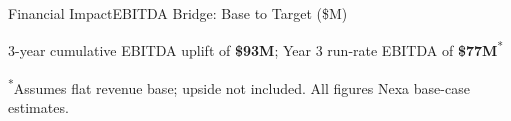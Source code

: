 \begin{frame}{Financial Impact}{EBITDA Bridge: Base to Target (\$M)}
\begin{center}
  \end{center}
  \vspace{-0.1cm}
  \begin{center}\scriptsize\textcolor{NexaSlate}{3-year cumulative EBITDA uplift of \textbf{\$93M}; Year 3 run-rate EBITDA of \textbf{\$77M}\textsuperscript{*}}\end{center}
  \vspace{0.05cm}
  \begin{center}\scriptsize\textcolor{NexaGray}{\textsuperscript{*}Assumes flat revenue base; upside not included. All figures Nexa base-case estimates.}\end{center}
\end{frame}

